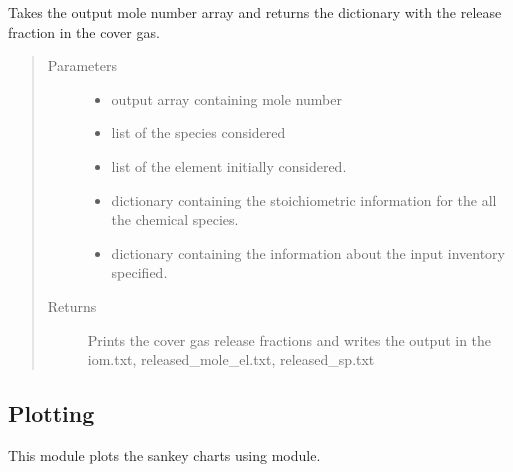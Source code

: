 \documentclass[letterpaper,10pt,english]{sphinxmanual}
\begin{document}
\begin{fulllineitems}
Takes the output mole number array and returns the dictionary with the
release fraction in the cover gas.
\begin{quote}\begin{description}
\item[{Parameters}] \leavevmode\begin{itemize}
\item {} 
 \textendash{} output array containing mole number

\item {} 
 \textendash{} list of the species considered

\item {} 
 \textendash{} list of the element initially considered.

\item {} 
 \textendash{} dictionary containing the stoichiometric information for the all the chemical species.

\item {} 
 \textendash{} dictionary containing the information
about the input inventory specified.

\end{itemize}

\item[{Returns}] \leavevmode
Prints the cover gas release fractions and writes the output in
the iom.txt, released\_mole\_el.txt, released\_sp.txt

\end{description}\end{quote}

\end{fulllineitems}



\subsection{Plotting}
\label{\detokenize{code_structure:plotting}}

This module plots the sankey charts using  module.
\end{document}
